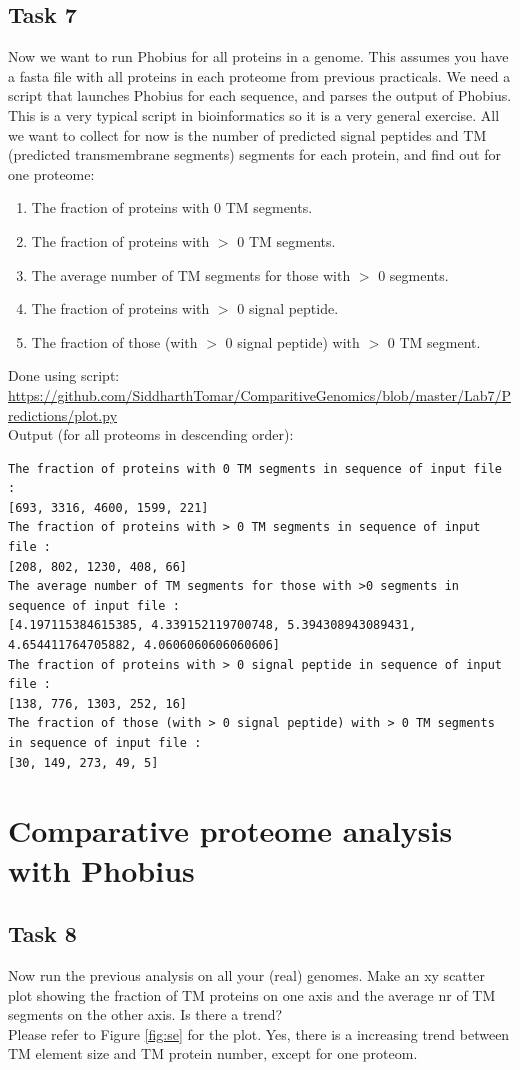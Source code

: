 \documentclass[a4paper,10pt]{article}
\begin{document}
\subsection*{Task 7}
\color{Gray}Now we want to run Phobius for all proteins in a genome. This assumes you have a fasta file with all proteins in each proteome from previous practicals. We need a script that launches Phobius for each sequence, and parses the output of Phobius. This is a very typical script in bioinformatics so it is a very general exercise. All we want to collect for now is the number of predicted signal peptides and TM (predicted transmembrane segments) segments for each protein, and find out for one proteome:
\begin{enumerate}[label=(\alph*)]
\item The fraction of proteins with 0 TM segments.
\item The fraction of proteins with $>$ 0 TM segments.
\item The average number of TM segments for those with $>$ 0 segments.
\item The fraction of proteins with $>$ 0 signal peptide.
\item The fraction of those (with $>$ 0 signal peptide) with $>$ 0 TM segment.
\end{enumerate}
\color{black}Done using script:\\
\url{https://github.com/SiddharthTomar/ComparitiveGenomics/blob/master/Lab7/Predictions/plot.py}\\
Output (for all proteoms in descending order): 
\begin{verbatim}
The fraction of proteins with 0 TM segments in sequence of input file :
[693, 3316, 4600, 1599, 221]
The fraction of proteins with > 0 TM segments in sequence of input file :
[208, 802, 1230, 408, 66]
The average number of TM segments for those with >0 segments in sequence of input file :
[4.197115384615385, 4.339152119700748, 5.394308943089431, 4.654411764705882, 4.0606060606060606]
The fraction of proteins with > 0 signal peptide in sequence of input file :
[138, 776, 1303, 252, 16]
The fraction of those (with > 0 signal peptide) with > 0 TM segments in sequence of input file :
[30, 149, 273, 49, 5]
\end{verbatim}

\section*{Comparative proteome analysis with Phobius}
\subsection*{Task 8}
\color{Gray}Now run the previous analysis on all your (real) genomes. Make an xy scatter plot showing the fraction of TM proteins on one axis and the average nr of TM segments on the other axis. Is there a trend?\color{black}\\
Please refer to Figure \ref{fig:se} for the plot. Yes, there is a increasing trend between TM element size and TM protein number, except for one proteom. 
\end{document}
